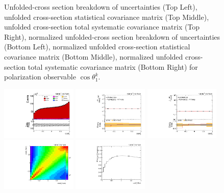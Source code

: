 \begin{figure}[htb]
\begin{center}
\caption{Unfolded-cross section breakdown of uncertainties (Top Left), unfolded cross-section statistical covariance matrix (Top Middle), unfolded cross-section total systematic covariance matrix (Top Right), normalized unfolded-cross section breakdown of uncertainties (Bottom Left), normalized unfolded cross-section statistical covariance matrix (Bottom Middle), normalized unfolded cross-section total systematic covariance matrix (Bottom Right) for polarization observable $\cos\theta_{1}^{k}$.}
\label{fig:b1k_uncertainties}
\end{center}
\end{figure}
\clearpage
\begin{figure}[htb]
\begin{center}
 \includegraphics[width=0.32\textwidth]{fig_fullRun2UL/controlplots/combined/Hyp_LeptonBk.pdf}
 \includegraphics[width=0.32\textwidth]{fig_fullRun2UL/unfolding/combined/UnfoldedResults_b2k.pdf}
 \includegraphics[width=0.32\textwidth]{fig_fullRun2UL/unfolding/combined/UnfoldedResultsNorm_b2k.pdf} \\
 \includegraphics[width=0.32\textwidth]{fig_fullRun2UL/unfolding/combined/ResponseMatrix_b2k.pdf}
 \includegraphics[width=0.32\textwidth]{fig_fullRun2UL/unfolding/combined/TotEff_b2k.pdf}

\end{center}
\end{figure}
